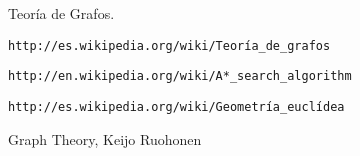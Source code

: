 \documentclass[journal]{IEEEtran}
\begin{document}
\renewcommand{\refname}{Referencias}
\begin{thebibliography}{50}
 Teoría de Grafos.\\
\begin{scriptsize}  \verb|http://es.wikipedia.org/wiki/Teoría_de_grafos|\end{scriptsize}
\begin{scriptsize}  \verb|http://en.wikipedia.org/wiki/A*_search_algorithm|\end{scriptsize}
\begin{scriptsize}  \verb|http://es.wikipedia.org/wiki/Geometría_euclídea|\end{scriptsize}
\begin{scriptsize}Graph Theory, Keijo Ruohonen \end{scriptsize}


\end{thebibliography}
\end{document}

